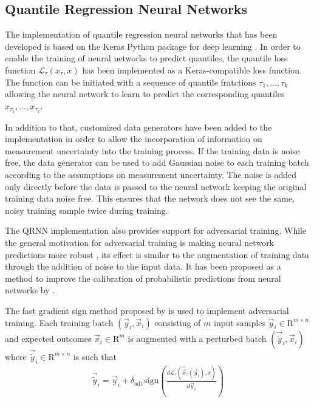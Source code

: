 \documentclass[journal abbreviation, manuscript]{copernicus}
\begin{document}
\subsection{Quantile Regression Neural Networks}

    The implementation of quantile regression neural networks that has been
    developed is based on the Keras Python package for deep learning
    \citep{keras}. In order to enable the training of neural networks to predict
    quantiles, the quantile loss function $\mathcal{L}_\tau(x_\tau, x)$ has been
    implemented as a Keras-compatible loss function. The function can be
    initiated with a sequence of quantile fratctions $\tau_1, \ldots, \tau_k$
    allowing the neural network to learn to predict the corresponding quantiles
    $x_{\tau_1}, \ldots, x_{\tau_k}$.

    In addition to that, customized data generators have been added to the
    implementation in order to allow the incorporation of information on
    measurement uncertainty into the training process. If the training data is
    noise free, the data generator can be used to add Gaussian noise to each
    training batch according to the assumptions on measurement uncertainty. The
    noise is added only directly before the data is passed to the neural network
    keeping the original training data noise free. This ensures that the network
    does not see the same, noisy training sample twice during training.

    The QRNN implementation also provides support for adversarial training.
    While the general motivation for adversarial training is making neural
    network predictions more robust \citep{goodfellow_2}, its effect is similar
    to the augmentation of training data through the addition of noise to the
    input data. It has been proposed as a method to improve the calibration of
    probabilistic predictions from neural networks by \cite{lakshminarayanan}.

    The fast gradient sign method proposed by \citet{goodfellow_2} is used
    to implement adversarial training. Each training batch $(\vec{y}_i, \vec{x}_i)$
    consisting of $m$ input samples $\vec{y}_i \in \mathrm{R}^{m \times n}$ and
    expected outcomes $\vec{x}_i \in \mathrm{R}^m$ is augmented with a perturbed
    batch $(\vec{\tilde{y}}_i, \vec{x}_i)$ where $\vec{\tilde{y}}_i \in
    \mathrm{R}^{m \times n}$ is such that
    \begin{align}
      \vec{\tilde{y}}_i = \vec{y}_i + \delta_\text{adv} \text{sign} \left (
      \frac{d \mathcal{L}_\tau(\hat{\vec{x}}_\tau(\vec{y}_i), x)}{d\vec{y}_i} \right
      )
    \end{align}
\end{document}
